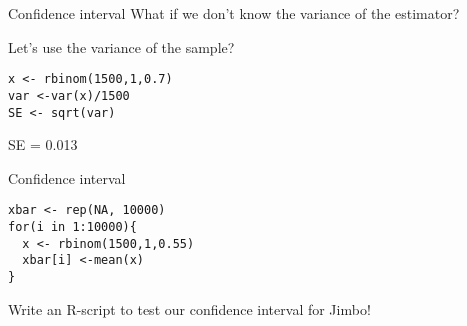 \documentclass[presentation]{beamer}
\begin{document}
\begin{frame}[fragile,label={sec:org252afc4}]{Confidence interval}
 What if we don't know the variance of the estimator?

Let's use the variance of the sample?

\begin{verbatim}
x <- rbinom(1500,1,0.7)
var <-var(x)/1500
SE <- sqrt(var)
\end{verbatim}

SE = 0.013
\end{frame}


\begin{frame}[fragile,label={sec:orgaf91f0b}]{Confidence interval}
 \begin{verbatim}
xbar <- rep(NA, 10000)
for(i in 1:10000){
  x <- rbinom(1500,1,0.55)
  xbar[i] <-mean(x)
}
\end{verbatim}

Write an R-script to test our confidence interval for Jimbo!
\end{frame}
\end{document}
